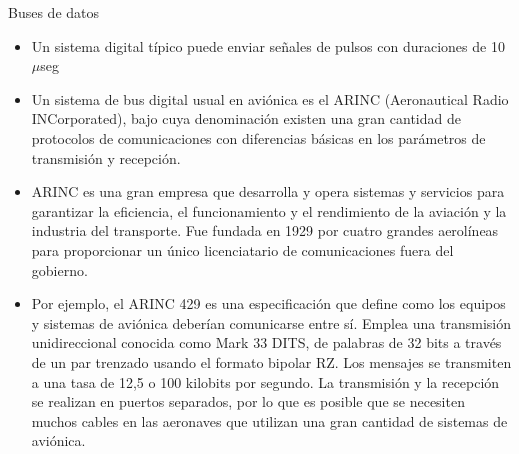 \begin{frame}



  \begin{exampleblock}{Buses de datos}
    \begin{itemize}
    \item Un sistema digital t\'ipico puede enviar se\~nales de pulsos
      con duraciones de 10 $\mu$seg

    \item Un sistema de bus digital usual en avi\'onica es el
      ARINC (Aeronautical Radio INCorporated), bajo cuya denominaci\'on existen una gran cantidad
      de protocolos de comunicaciones con diferencias b\'asicas en los
      par\'ametros de transmisi\'on y recepci\'on.

    \item ARINC es una gran empresa que desarrolla y opera
      sistemas y servicios para garantizar la eficiencia, el
      funcionamiento y el rendimiento de la aviaci\'on y la industria
      del transporte. Fue fundada en 1929 por cuatro grandes
      aerol\'ineas para proporcionar un \'unico licenciatario de
      comunicaciones fuera del gobierno.

    \item Por ejemplo, el ARINC 429 es una especificaci\'on que define
      como los equipos y sistemas de avi\'onica deber\'ian comunicarse
      entre s\'i. Emplea una transmisi\'on unidireccional conocida
      como Mark 33 DITS, de palabras de 32 bits a trav\'es de un
      par trenzado usando el formato bipolar RZ. Los mensajes se
      transmiten a una tasa de 12,5 o 100 kilobits por segundo. La
      transmisi\'on y la recepci\'on se realizan en puertos separados,
      por lo que es posible que se necesiten muchos cables en las
      aeronaves que utilizan una gran cantidad de sistemas de
      avi\'onica.
    \end{itemize}
  \end{exampleblock}

\end{frame}

